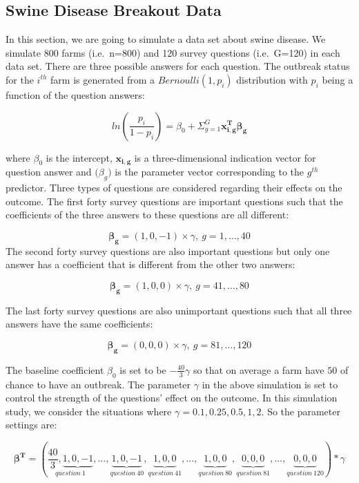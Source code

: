 \documentclass[
]{article}
\begin{document}
\hypertarget{swine-disease-breakout-data}{%
\subsection{Swine Disease Breakout
Data}\label{swine-disease-breakout-data}}

In this section, we are going to simulate a data set about swine
disease. We simulate 800 farms (i.e.~n=800) and 120 survey questions
(i.e.~G=120) in each data set. There are three possible answers for each
question. The outbreak status for the \(i^{th}\) farm is generated from
a \(Bernoulli(1, p_i)\) distribution with \(p_i\) being a function of
the question answers:

\[ln(\frac{p_i}{1-p_i})=\beta_0 + \Sigma_{g=1}^G\mathbf{x_{i,g}^T\beta_{g}}\]

where \(\beta_0\) is the intercept, \(\mathbf{x_{i,g}}\) is a
three-dimensional indication vector for question answer and
\(\mathbf(\beta_g)\) is the parameter vector corresponding to the
\(g^{th}\) predictor. Three types of questions are considered regarding
their effects on the outcome. The first forty survey questions are
important questions such that the coefficients of the three answers to
these questions are all different:

\[\mathbf{\beta_g}=(1,0,-1)\times \gamma,\ g=1,\dots,40\] The second
forty survey questions are also important questions but only one answer
has a coefficient that is different from the other two answers:

\[\mathbf{\beta_g}=(1,0,0)\times \gamma,\ g=41,\dots,80\]

The last forty survey questions are also unimportant questions such that
all three answers have the same coefficients:

\[\mathbf{\beta_g}=(0,0,0)\times \gamma,\ g=81,\dots,120\]

The baseline coefficient \(\beta_0\) is set to be
\(-\frac{40}{3}\gamma\) so that on average a farm have \(50%
\) of chance to have an outbreak. The parameter \(\gamma\) in the above
simulation is set to control the strength of the questions' effect on
the outcome. In this simulation study, we consider the situations where
\(\gamma = 0.1, 0.25, 0.5, 1, 2\). So the parameter settings are:

\[\mathbf{\beta^{T}}=\left(\underset{question\ 1}{\frac{40}{3},\underbrace{1,0,-1}},...,\underset{question\ 40}{\underbrace{1,0,-1}},\underset{question\ 41}{\underbrace{1,0,0}},...,\underset{question\ 80}{\underbrace{1,0,0}},\underset{question\ 81}{\underbrace{0,0,0}},...,\underset{question\ 120}{\underbrace{0,0,0}}\right)*\gamma\]
\end{document}
